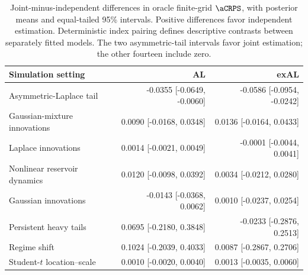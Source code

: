 \begin{table}[!htbp]
\centering
\footnotesize
\setlength{\tabcolsep}{3pt}
\renewcommand{\arraystretch}{1.08}
\begin{tabular}{@{}>{\raggedright\arraybackslash}p{}rr@{}}
\toprule
Simulation setting & AL & exAL \\
\midrule
Asymmetric-Laplace tail & -0.0355 [-0.0649, -0.0060] & -0.0586 [-0.0954, -0.0242] \\
Gaussian-mixture innovations & 0.0090 [-0.0168, 0.0348] & 0.0136 [-0.0164, 0.0433] \\
Laplace innovations & 0.0014 [-0.0021, 0.0049] & -0.0001 [-0.0044, 0.0041] \\
Nonlinear reservoir dynamics & 0.0120 [-0.0098, 0.0392] & 0.0034 [-0.0212, 0.0280] \\
Gaussian innovations & -0.0143 [-0.0368, 0.0062] & 0.0010 [-0.0237, 0.0254] \\
Persistent heavy tails & 0.0695 [-0.2180, 0.3848] & -0.0233 [-0.2876, 0.2513] \\
Regime shift & 0.1024 [-0.2039, 0.4033] & 0.0087 [-0.2867, 0.2706] \\
Student-\(t\) location--scale & 0.0010 [-0.0020, 0.0040] & 0.0013 [-0.0035, 0.0060] \\
\bottomrule
\end{tabular}
\caption{Joint-minus-independent differences in oracle finite-grid \(\aCRPS\), with posterior means and equal-tailed 95\% intervals. Positive differences favor independent estimation. Deterministic index pairing defines descriptive contrasts between separately fitted models. The two asymmetric-tail intervals favor joint estimation; the other fourteen include zero.}
\label{tab:joint-qdesn-pure-desn-v2-contrasts}
\end{table}
